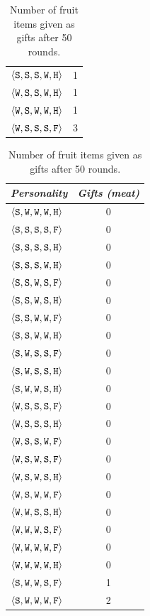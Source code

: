 \begin{table}
{{\begin{minipage}[b]{0.30\hsize}
\begin{tabular}{ l | c }
					$\personality{S}{S}{S}{W}{H}$ & 1\\
					$\personality{W}{S}{S}{W}{H}$ & 1\\
					$\personality{W}{S}{W}{W}{H}$ & 1\\
					$\personality{W}{S}{S}{S}{F}$ & 3\\
					\hline
				\end{tabular}
				\caption{Number of fruit items given as gifts after 50 rounds.}
				\label{tab:numFruitGiven}
			\end{minipage}
			\hfill
			\begin{minipage}[b]{0.30\hsize}\centering
				\begin{tabular}{ l | c }
					\emph{Personality} & \emph{Gifts (meat)} \\
					\hline
					$\personality{S}{W}{W}{W}{H}$ & 0\\
					$\personality{S}{S}{S}{S}{F}$ & 0\\
					$\personality{S}{S}{S}{S}{H}$ & 0\\
					$\personality{S}{S}{S}{W}{H}$ & 0\\
					$\personality{S}{S}{W}{S}{F}$ & 0\\
					$\personality{S}{S}{W}{S}{H}$ & 0\\
					$\personality{S}{S}{W}{W}{F}$ & 0\\
					$\personality{S}{S}{W}{W}{H}$ & 0\\
					$\personality{S}{W}{S}{S}{F}$ & 0\\
					$\personality{S}{W}{S}{S}{H}$ & 0\\
					$\personality{S}{W}{W}{S}{H}$ & 0\\
					$\personality{W}{S}{S}{S}{F}$ & 0\\
					$\personality{W}{S}{S}{S}{H}$ & 0\\
					$\personality{W}{S}{S}{W}{F}$ & 0\\
					$\personality{W}{S}{W}{S}{F}$ & 0\\
					$\personality{W}{S}{W}{S}{H}$ & 0\\
					$\personality{W}{S}{W}{W}{F}$ & 0\\
					$\personality{W}{W}{S}{S}{H}$ & 0\\
					$\personality{W}{W}{W}{S}{F}$ & 0\\
					$\personality{W}{W}{W}{W}{F}$ & 0\\
					$\personality{W}{W}{W}{W}{H}$ & 0\\
					$\personality{S}{W}{W}{S}{F}$ & 1\\
					$\personality{S}{W}{W}{W}{F}$ & 2\\

\end{tabular}
\end{minipage}}}
\end{table}
